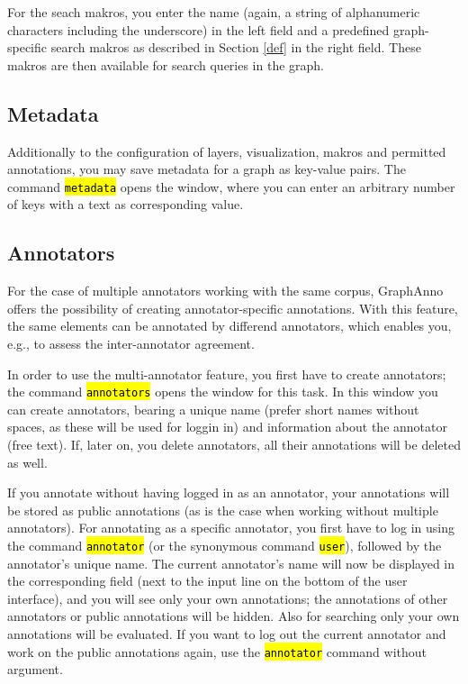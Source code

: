 \documentclass[12pt]{scrartcl}
\newcommand{\code}[1]{\hl{\texttt{#1}}}
\begin{document}
For the seach makros, you enter the name (again, a string of alphanumeric characters including the underscore) in the left field and a predefined graph-specific search makros as described in Section \ref{def} in the right field.
These makros are then available for search queries in the graph.


\subsection{Metadata}

Additionally to the configuration of layers, visualization, makros and permitted annotations, you may save metadata for a graph as key-value pairs.
The command \code{metadata} opens the window, where you can enter an arbitrary number of keys with a text as corresponding value.


\subsection{Annotators}\label{annotatoren}

For the case of multiple annotators working with the same corpus, GraphAnno offers the possibility of creating annotator-specific annotations.
With this feature, the same elements can be annotated by differend annotators, which enables you, e.g., to assess the inter-annotator agreement.

In order to use the multi-annotator feature, you first have to create annotators; the command \code{annotators} opens the window for this task.
In this window you can create annotators, bearing a unique name (prefer short names without spaces, as these will be used for loggin in) and information about the annotator (free text).
If, later on, you delete annotators, all their annotations will be deleted as well.

If you annotate without having logged in as an annotator, your annotations will be stored as public annotations (as is the case when working without multiple annotators).
For annotating as a specific annotator, you first have to log in using the command \code{annotator} (or the synonymous command \code{user}), followed by the annotator’s unique name.
The current annotator’s name will now be displayed in the corresponding field (next to the input line on the bottom of the user interface), and you will see only your own annotations; the annotations of other annotators or public annotations will be hidden.
Also for searching only your own annotations will be evaluated.
If you want to log out the current annotator and work on the public annotations again, use the \code{annotator} command without argument.
\end{document}

